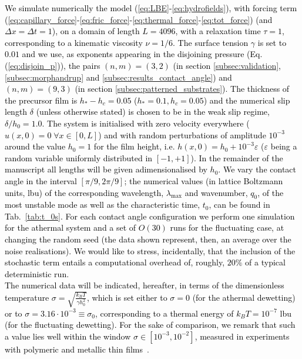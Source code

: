 \textcolor{black}{We simulate numerically the model 
(\ref{eq:LBE}-\ref{eq:hydrofields}), with forcing term (\ref{eq:capillary_force}-\ref{eq:fric_force}-\ref{eq:thermal_force}-\ref{eq:tot_force}) (and $\Delta x = \Delta t = 1$), on a domain 
of length $L=4096$,
with a relaxation time $\tau = 1$, corresponding to a kinematic viscosity $\nu = 1/6$.
The surface tension $\gamma$ is set to $0.01$ and we use, as exponents appearing in the disjoining pressure (Eq. (\ref{eq:disjoin_p})),
the pairs $(n,m)=(3,2)$ (in section \ref{subsec:validation}, \ref{subsec:morphandrup} and \ref{subsec:results_contact_angle}) 
and $(n,m)=(9,3)$ (in section \ref{subsec:patterned_substrates}).
The thickness of the precursor film is $h_{\ast}-h_c = 0.05$ ($h_{\ast}=0.1, h_c = 0.05$) and the numerical slip length $\delta$ (unless otherwise stated)
is chosen to be in the weak slip regime, $\delta/h_0 = 1.0$. %
The system is initialised with zero velocity everywhere ($u(x,0)=0 \; \forall x \in [0, L]$)
and with random perturbations of amplitude $10^{-3}$ around the value $h_0 = 1$ for the film height, i.e. 
$h(x,0) = h_0 + 10^{-3} \varepsilon$ ($\varepsilon$ being a random variable uniformly distributed 
in $[-1, +1]$).
In the remainder of the manuscript all lengths will be given adimensionalised by $h_0$.
We vary the contact angle in the interval $[\pi/9, 2\pi/9 ]$;
the numerical values (in lattice Boltzmann units, lbu) of the corresponding wavelength, $\lambda_{\text{max}}$ and wavenumber, $q_0$, of the most unstable mode as well as the characteristic time, $t_0$, can be found in Tab.~\ref{tab:t_0s}.
For each contact angle configuration we perform one simulation for the athermal system and a set 
of $O(30)$ runs for the fluctuating case, at changing the random seed (the data shown represent, then, an average over the noise realisations). We would like to stress, incidentally, that the inclusion of 
the stochastic term entails a computational overhead of, roughly, $20\%$ of a typical deterministic run.\\ 
The numerical data will be indicated, hereafter, in terms of the dimensionless temperature $\sigma = \sqrt{\frac{k_B T}{\gamma h_0^2}}$, which is set either to $\sigma=0$ (for the athermal dewetting) or to $\sigma = 3.16 \cdot 10^{-3} \equiv \sigma_0$, 
corresponding to a thermal energy
of $k_B T = 10^{-7}$ lbu (for the fluctuating dewetting). For the sake of comparison, we remark 
that such a value lies well within the window $\sigma \in [10^{-3}, 10^{-2}]$, measured in experiments with polymeric and metallic thin films~\cite{PhysRevLett.99.114503,doi:10.1021/la4009784}}.

